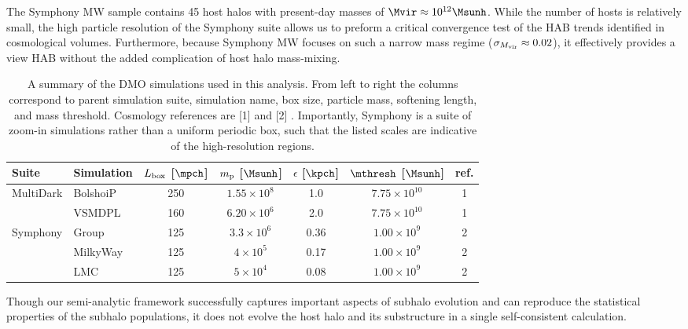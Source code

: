 The Symphony MW sample contains 45 host halos with present-day masses of $\Mvir \approx 10^{12} \Msunh$. While the number of hosts is relatively small, the high particle resolution of the Symphony suite allows us to preform a critical convergence test of the HAB trends identified in cosmological volumes. Furthermore, because Symphony MW focuses on such a narrow mass regime ($\sigma_{M_{\rm vir}} \approx 0.02$), it effectively provides a view HAB without the added complication of host halo mass-mixing. 

\begin{table}[htbp]
\centering
    \begin{tabular}{l|l|c|c|c|c|c}
    \hline
    \hline
    Suite & Simulation & $L_{\rm box}$ [$\mpch$] & $m_{\rm p}$ [$\Msunh$] & $\epsilon$ [$\kpch$] & $\mthresh$ [$\Msunh$] & ref. \\
    \hline
    \multirow{2}{*}{MultiDark}
    & BolshoiP & 250 & $1.55 \times 10^{8}$ & 1.0 & $7.75 \times 10^{10}$ & 1 \\
    & VSMDPL   & 160 & $6.20 \times 10^{6}$ & 2.0 & $7.75 \times 10^{10}$ & 1 \\
    \hline
    \multirow{3}{*}{Symphony}
    & Group    & 125 & $3.3 \times 10^{6}$ & 0.36 & $1.00 \times 10^{9}$ & 2 \\
    & MilkyWay & 125 & $4 \times 10^{5}$ & 0.17 & $1.00 \times 10^{9}$ & 2 \\
    & LMC      & 125 & $5 \times 10^{4}$ & 0.08 & $1.00 \times 10^{9}$ & 2 \\
    \hline
    \end{tabular}
    \caption{A summary of the DMO simulations used in this analysis. From left to right the columns correspond to parent simulation suite, simulation name, box size, particle mass, softening length, and mass threshold. Cosmology references are [1] \cite{Klypin.etal.16} and [2] \cite{Nadler.etal.23}. Importantly, Symphony is a suite of zoom-in simulations rather than a uniform periodic box, such that the listed scales are indicative of the high-resolution regions.}
    \label{tab:sims}
\end{table}

Though our semi-analytic framework successfully captures important aspects of subhalo evolution and can reproduce the statistical properties of the subhalo populations, it does not evolve the host halo and its substructure in a single self-consistent calculation.

